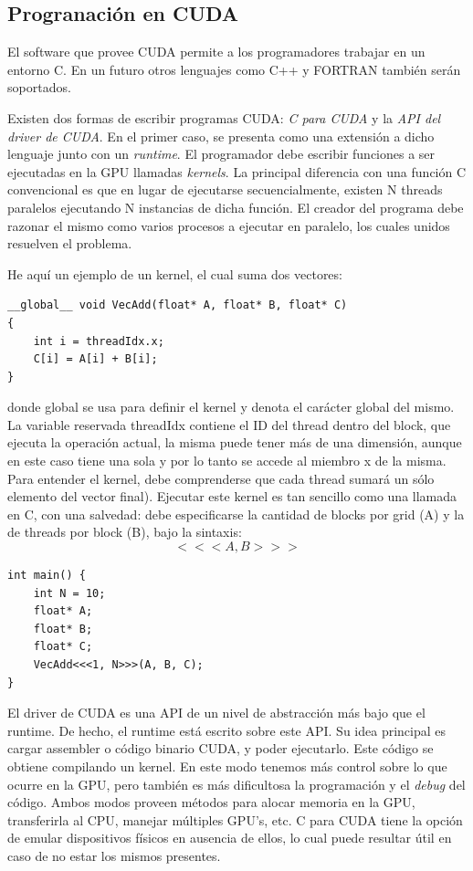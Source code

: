 \subsection{Progranación en CUDA}
El software que provee CUDA permite a los programadores trabajar en un entorno C.
En un futuro otros lenguajes como C++ y FORTRAN tambi\'en ser\'an soportados. 

Existen dos formas de escribir programas CUDA: {\em C para CUDA} y la {\em API del driver de CUDA}.
En el primer caso, se presenta como una extensi\'on a dicho lenguaje junto con un {\em runtime}.
El programador debe escribir funciones a ser ejecutadas en la GPU llamadas {\em kernels}. 
La principal diferencia con una funci\'on C convencional es que en lugar de ejecutarse secuencialmente, existen N threads paralelos ejecutando N instancias de dicha funci\'on. 
El creador del programa debe razonar el mismo como varios procesos a ejecutar en paralelo, los cuales unidos resuelven el problema.

He aqu\'i un ejemplo de un kernel, el cual suma dos vectores:

\begin{verbatim}
__global__ void VecAdd(float* A, float* B, float* C)
{
    int i = threadIdx.x;
    C[i] = A[i] + B[i];
}
\end{verbatim}

donde global se usa para definir el kernel y denota el car\'acter global del mismo.
La variable reservada threadIdx contiene el ID del thread dentro del block, que ejecuta la operaci\'on actual, la misma puede tener m\'as de una dimensi\'on, aunque en este caso tiene una sola y por lo tanto se accede al miembro x de la misma.
Para entender el kernel, debe comprenderse que cada thread sumar\'a un s\'olo elemento del vector final).
Ejecutar este kernel es tan sencillo como una llamada en C, con una salvedad: debe especificarse la cantidad de blocks por grid (A) y la de threads por block (B), bajo la sintaxis:
$$<<<A , B >>>$$

\begin{verbatim}
int main() {
    int N = 10;
    float* A;
    float* B;
    float* C;
    VecAdd<<<1, N>>>(A, B, C);
}

\end{verbatim}


El driver de CUDA es una API de un nivel de abstracci\'on m\'as bajo que el runtime.
De hecho, el runtime est\'a escrito sobre este API.
Su idea principal es cargar assembler o c\'odigo binario CUDA, y poder ejecutarlo.
Este c\'odigo se obtiene compilando un kernel.
En este modo tenemos m\'as control sobre lo que ocurre en la GPU, pero tambi\'en es m\'as dificultosa la programaci\'on y el {\em debug} del c\'odigo.
Ambos modos proveen m\'etodos para alocar memoria en la GPU, transferirla al CPU, manejar m\'ultiples GPU's, etc.
C para CUDA tiene la opci\'on de emular dispositivos f\'isicos en ausencia de ellos, lo cual puede resultar \'util en caso de no estar los mismos presentes.

